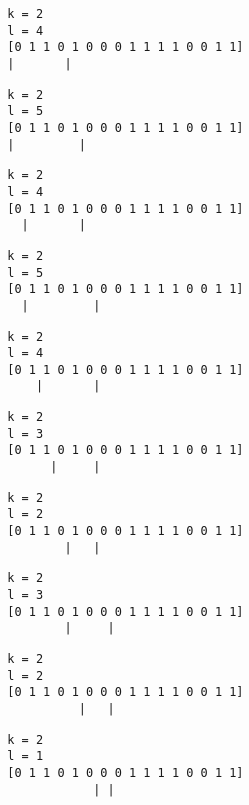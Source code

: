 { \begin{verbatim}
        k = 2
        l = 4
        [0 1 1 0 1 0 0 0 1 1 1 1 0 0 1 1]
        |       |
\end{verbatim} }

{ \begin{verbatim}
        k = 2
        l = 5
        [0 1 1 0 1 0 0 0 1 1 1 1 0 0 1 1]
        |         |
\end{verbatim} }

{ \begin{verbatim}
        k = 2
        l = 4
        [0 1 1 0 1 0 0 0 1 1 1 1 0 0 1 1]
          |       |
\end{verbatim} }

{ \begin{verbatim}
        k = 2
        l = 5
        [0 1 1 0 1 0 0 0 1 1 1 1 0 0 1 1]
          |         |
\end{verbatim} }

{ \begin{verbatim}
        k = 2
        l = 4
        [0 1 1 0 1 0 0 0 1 1 1 1 0 0 1 1]
            |       |
\end{verbatim} }

{ \begin{verbatim}
        k = 2
        l = 3
        [0 1 1 0 1 0 0 0 1 1 1 1 0 0 1 1]
              |     |
\end{verbatim} }

{ \begin{verbatim}
        k = 2
        l = 2
        [0 1 1 0 1 0 0 0 1 1 1 1 0 0 1 1]
                |   |
\end{verbatim} }

{ \begin{verbatim}
        k = 2
        l = 3
        [0 1 1 0 1 0 0 0 1 1 1 1 0 0 1 1]
                |     |
\end{verbatim} }

{ \begin{verbatim}
        k = 2
        l = 2
        [0 1 1 0 1 0 0 0 1 1 1 1 0 0 1 1]
                  |   |
\end{verbatim} }

{ \begin{verbatim}
        k = 2
        l = 1
        [0 1 1 0 1 0 0 0 1 1 1 1 0 0 1 1]
                    | |
\end{verbatim} }

